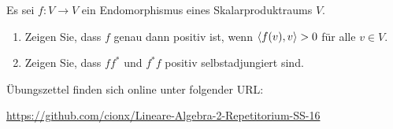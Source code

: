 \documentclass[a4paper, 10pt]{scrartcl}
\begin{document}
\begin{question}
  Es sei $f \colon V \to V$ ein Endomorphismus eines Skalarproduktraums $V$.
  \begin{enumerate}[leftmargin=*]
    \item
      Zeigen Sie, dass $f$ genau dann positiv ist, wenn $\left\langle f(v), v \right\rangle > 0$ für alle $v \in V$.
    \item
      Zeigen Sie, dass $f f^*$ und $f^* f$ positiv selbstadjungiert sind.
  \end{enumerate}
\end{question}




Übungszettel finden sich online unter folgender URL:\\
\centerline{\url{https://github.com/cionx/Lineare-Algebra-2-Repetitorium-SS-16}}


\newpage


\printsolutions
\end{document}
